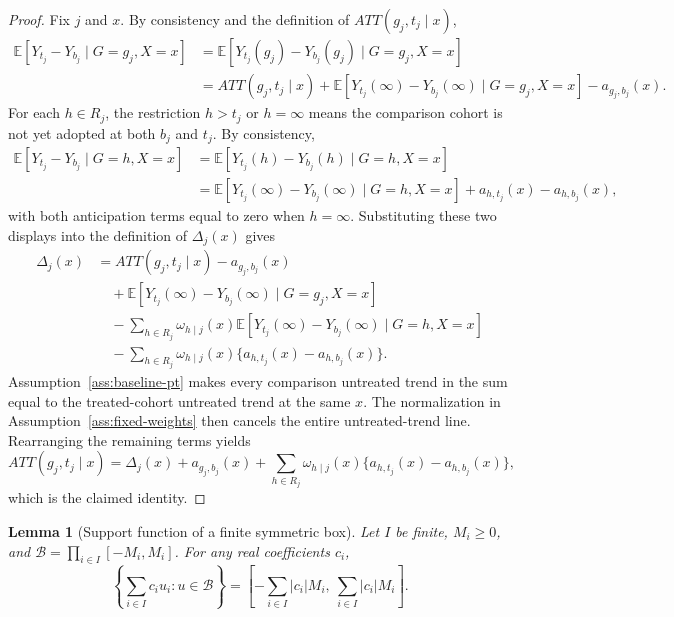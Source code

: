 \documentclass[11pt]{article}
\newcommand{\E}{\mathbb{E}}
\theoremstyle{definition}
\theoremstyle{plain}
\newtheorem{lemma}{Lemma}
\theoremstyle{remark}
\begin{document}
\begin{proof}
Fix \(j\) and \(x\).  By consistency and the definition of \(ATT(g_j,t_j\mid x)\),
\[
\begin{aligned}
  \E[Y_{t_j}-Y_{b_j}\mid G=g_j,X=x]
  &=
  \E[Y_{t_j}(g_j)-Y_{b_j}(g_j)\mid G=g_j,X=x] \\
  &=
  ATT(g_j,t_j\mid x)
  +\E[Y_{t_j}(\infty)-Y_{b_j}(\infty)\mid G=g_j,X=x]
  -a_{g_j,b_j}(x).
\end{aligned}
\]
For each \(h\in R_j\), the restriction \(h>t_j\) or \(h=\infty\) means the
comparison cohort is not yet adopted at both \(b_j\) and \(t_j\).  By consistency,
\[
\begin{aligned}
  \E[Y_{t_j}-Y_{b_j}\mid G=h,X=x]
  &=
  \E[Y_{t_j}(h)-Y_{b_j}(h)\mid G=h,X=x] \\
  &=
  \E[Y_{t_j}(\infty)-Y_{b_j}(\infty)\mid G=h,X=x]
  +a_{h,t_j}(x)-a_{h,b_j}(x),
\end{aligned}
\]
with both anticipation terms equal to zero when \(h=\infty\).  Substituting these
two displays into the definition of \(\Delta_j(x)\) gives
\[
\begin{aligned}
  \Delta_j(x)
  &=
  ATT(g_j,t_j\mid x)-a_{g_j,b_j}(x) \\
  &\quad
  +\E[Y_{t_j}(\infty)-Y_{b_j}(\infty)\mid G=g_j,X=x] \\
  &\quad
  -\sum_{h\in R_j}\omega_{h\mid j}(x)
    \E[Y_{t_j}(\infty)-Y_{b_j}(\infty)\mid G=h,X=x] \\
  &\quad
  -\sum_{h\in R_j}\omega_{h\mid j}(x)
    \{a_{h,t_j}(x)-a_{h,b_j}(x)\}.
\end{aligned}
\]
Assumption~\ref{ass:baseline-pt} makes every comparison untreated trend in the
sum equal to the treated-cohort untreated trend at the same \(x\).  The
normalization in Assumption~\ref{ass:fixed-weights} then cancels the entire
untreated-trend line.  Rearranging the remaining terms yields
\[
  ATT(g_j,t_j\mid x)
  =
  \Delta_j(x)
  +a_{g_j,b_j}(x)
  +\sum_{h\in R_j}\omega_{h\mid j}(x)
    \{a_{h,t_j}(x)-a_{h,b_j}(x)\},
\]
which is the claimed identity.
\end{proof}

\begin{lemma}[Support function of a finite symmetric box]\label{lem:box-support}
Let \(I\) be finite, \(M_i\ge0\), and
\(\mathcal{B}=\prod_{i\in I}[-M_i,M_i]\).  For any real coefficients \(c_i\),
\[
  \left\{\sum_{i\in I}c_i u_i:u\in\mathcal{B}\right\}
  =
  \left[-\sum_{i\in I}|c_i|M_i,\ \sum_{i\in I}|c_i|M_i\right].
\]
\end{lemma}
\end{document}
